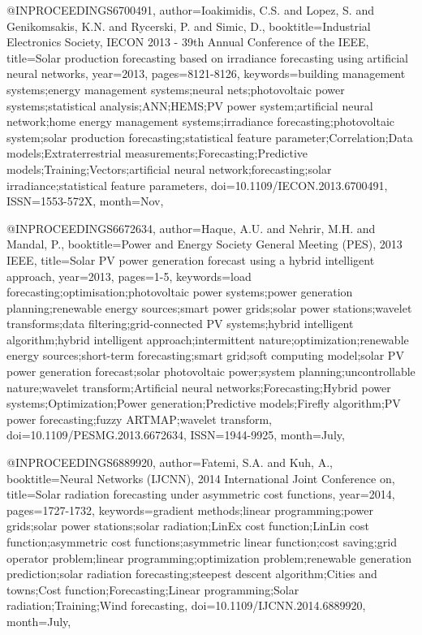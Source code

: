 {@INPROCEEDINGS{6700491, 
author={Ioakimidis, C.S. and Lopez, S. and Genikomsakis, K.N. and Rycerski, P. and Simic, D.}, 
booktitle={Industrial Electronics Society, IECON 2013 - 39th Annual Conference of the IEEE}, 
title={Solar production forecasting based on irradiance forecasting using artificial neural networks}, 
year={2013}, 
pages={8121-8126}, 
keywords={building management systems;energy management systems;neural nets;photovoltaic power systems;statistical analysis;ANN;HEMS;PV power system;artificial neural network;home energy management systems;irradiance forecasting;photovoltaic system;solar production forecasting;statistical feature parameter;Correlation;Data models;Extraterrestrial measurements;Forecasting;Predictive models;Training;Vectors;artificial neural network;forecasting;solar irradiance;statistical feature parameters}, 
doi={10.1109/IECON.2013.6700491}, 
ISSN={1553-572X}, 
month={Nov},}

@INPROCEEDINGS{6672634, 
author={Haque, A.U. and Nehrir, M.H. and Mandal, P.}, 
booktitle={Power and Energy Society General Meeting (PES), 2013 IEEE}, 
title={Solar PV power generation forecast using a hybrid intelligent approach}, 
year={2013}, 
pages={1-5}, 
keywords={load forecasting;optimisation;photovoltaic power systems;power generation planning;renewable energy sources;smart power grids;solar power stations;wavelet transforms;data filtering;grid-connected PV systems;hybrid intelligent algorithm;hybrid intelligent approach;intermittent nature;optimization;renewable energy sources;short-term forecasting;smart grid;soft computing model;solar PV power generation forecast;solar photovoltaic power;system planning;uncontrollable nature;wavelet transform;Artificial neural networks;Forecasting;Hybrid power systems;Optimization;Power generation;Predictive models;Firefly algorithm;PV power forecasting;fuzzy ARTMAP;wavelet transform}, 
doi={10.1109/PESMG.2013.6672634}, 
ISSN={1944-9925}, 
month={July},}

@INPROCEEDINGS{6889920, 
author={Fatemi, S.A. and Kuh, A.}, 
booktitle={Neural Networks (IJCNN), 2014 International Joint Conference on}, 
title={Solar radiation forecasting under asymmetric cost functions}, 
year={2014}, 
pages={1727-1732}, 
keywords={gradient methods;linear programming;power grids;solar power stations;solar radiation;LinEx cost function;LinLin cost function;asymmetric cost functions;asymmetric linear function;cost saving;grid operator problem;linear programming;optimization problem;renewable generation prediction;solar radiation forecasting;steepest descent algorithm;Cities and towns;Cost function;Forecasting;Linear programming;Solar radiation;Training;Wind forecasting}, 
doi={10.1109/IJCNN.2014.6889920}, 
month={July},}

}
